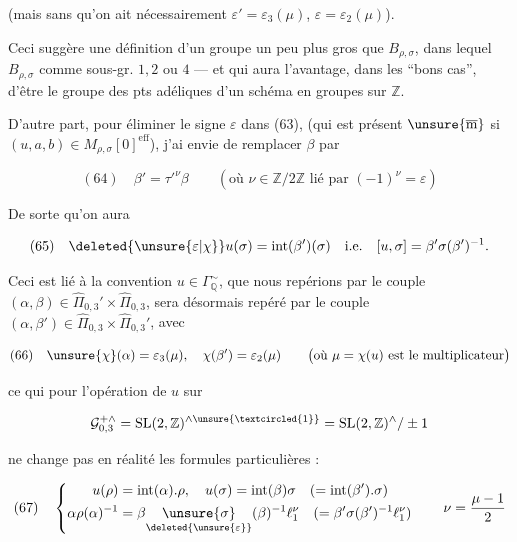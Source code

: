 (mais sans qu'on ait nécessairement
$\varepsilon'=\varepsilon_3(\mu)$, $\varepsilon=\varepsilon_2(\mu)$).

Ceci suggère une définition d'un groupe un peu plus gros que $B_{\rho,\sigma}$,
dans lequel $B_{\rho,\sigma}$  
comme sous-gr.  
$1,2$ ou $4$ --- et qui aura l'avantage, dans les ``bons cas'', d'être le groupe
des pts adéliques d'un schéma en groupes  sur $\mathbb Z$.

D'autre part, pour  éliminer le signe
$\varepsilon$ dans (63), (qui est présent $\unsure{\overline{\mathrm m}}$ si
$(u,a,b)\in M_{\rho,\sigma}[0]^{\mathrm{eff}}$), j'ai envie de remplacer $\beta$ par


\[
(64)\quad \beta'=\tau'^{\nu}\beta
\qquad\left(\text{où }\nu\in\mathbb Z/2\mathbb Z\text{ lié par }
(-1)^\nu=\varepsilon\right)
\]

De sorte qu'on aura

\[
(65)\quad \deleted{\unsure{\varepsilon|\chi}}u(\sigma)=\operatorname{int}(\beta')(\sigma)
\quad\text{i.e.}\quad [u,\sigma]=\beta'\sigma(\beta')^{-1}.
\]

Ceci est lié à la convention 
$u\in\Gamma_{\mathbb Q}^{\sim}$, que nous repérions par le couple
$(\alpha,\beta)\in\widehat{\Pi}_{0,3}'\times\widehat{\Pi}_{0,3}$,
sera désormais repéré par le couple
$(\alpha,\beta')\in\widehat{\Pi}_{0,3}\times\widehat{\Pi}_{0,3}'$, avec

\[
(66)\quad\unsure{\chi}(\alpha)=\varepsilon_3(\mu),
\quad\chi(\beta')=\varepsilon_2(\mu)
\qquad\bigl(\text{où }\mu=\chi(u)\text{ est le multiplicateur}\bigr)
\]

ce qui  pour l'opération de $u$ sur

\[
\mathcal G_{0,3}^{+\wedge}
=\mathrm{SL}(2,\mathbb Z)^{\wedge\unsure{\textcircled{1}}}
=\mathrm{SL}(2,\mathbb Z)^{\wedge}/\pm1
\]

ne change pas en réalité les formules particulières :

\[
(67)\quad\left\{\begin{aligned}
u(\rho)&=\operatorname{int}(\alpha).\rho,\quad
u(\sigma)=\operatorname{int}(\beta)\sigma
\quad(=\operatorname{int}(\beta').\sigma)\\
\alpha\rho(\alpha)^{-1}
&=\beta\underset{\deleted{\unsure{\varepsilon}}}{\unsure{\sigma}}(\beta)^{-1}\ell_1^\nu
\quad(=\beta'\sigma(\beta')^{-1}\ell_1^\nu)
\end{aligned}\right.
\qquad\nu=\frac{\mu-1}{2}
\]

